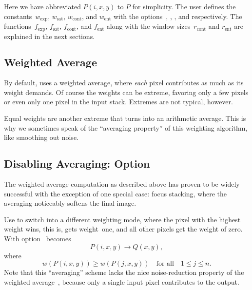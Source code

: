 \noindent Here we have abbreviated $P(i, x, y)$ to $P$ for
simplicity.  The user defines the constants~$w_{\mathrm{exp}}$,
$w_{\mathrm{sat}}$, $w_{\mathrm{cont}}$, and $w_{\mathrm{ent}}$ with
the options~, ,
, and 
respectively.  The functions~$f_{\mathrm{exp}}$, $f_{\mathrm{sat}}$,
$f_{\mathrm{cont}}$, and $f_{\mathrm{ent}}$ along with the window
sizes~$r_{\mathrm{cont}}$ and $r_{\mathrm{ent}}$ are explained in the
next sections.


\subsection[Weighted Average]{Weighted Average
  \label{sec:weighted-average}
  }

By default, \App{} uses a weighted average, where \emph{each} pixel
contributes as much as its weight demands.  Of course the weights can
be extreme, favoring only a few pixels or even only one pixel in the
input stack.  Extremes are not typical, however.

Equal weights are another extreme that turns  into
an arithmetic average.  This is why we sometimes speak of the
``averaging property'' of this weighting algorithm, like smoothing out
noise.


\subsection[Disabling Averaging]%
{Disabling Averaging: Option~
  \label{sec:disabling-averaging}
  }

The weighted average computation as described above has proven to be
widely successful with the exception of one special case: focus
stacking, where the averaging noticeably softens the final image.

Use  to switch \App{} into a different weighting
mode, where the pixel with the highest weight wins, this is, gets
weight~one, and all other pixels get the weight of zero.  With
option~  becomes
\[                              %
    P(i, x, y) \rightarrow Q(x, y),
\]
where
\[
    w(P(i, x, y)) \geq w(P(j, x, y)) \quad \mbox{for all}\quad 1 \leq j \leq n.
\]
\noindent Note that this ``averaging'' scheme lacks the nice
noise-reduction property of the weighted average~,
because only a single input pixel contributes to the output.


